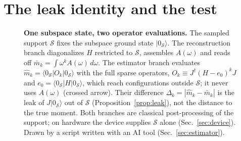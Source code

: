 \documentclass[aps,prb,reprint,onecolumn,12pt,superscriptaddress,longbibliography,floatfix]{revtex4-2}
\begin{document}
\section{The leak identity and the test}
\label{sec:method}

\begin{figure}[t]
\centering
{}
\caption{\textbf{One subspace state, two operator evaluations.} The sampled support $\mathcal S$ fixes the subspace ground state $|0_\mathcal S\rangle$. The reconstruction branch diagonalizes $H$ restricted to $\mathcal S$, assembles $A(\omega)$ and reads off $\bar m_k=\int\omega^kA(\omega)\,d\omega$. The estimator branch evaluates $\widehat m_k=\langle 0_\mathcal S|O_k|0_\mathcal S\rangle$ with the full sparse operators, $O_k\equiv J^\dagger(H-e_0)^kJ$ and $e_0=\langle 0_\mathcal S|H|0_\mathcal S\rangle$, which reach configurations outside $\mathcal S$; it never uses $A(\omega)$ (crossed arrow). Their difference $\Delta_k=|\widehat m_k-\bar m_k|$ is the leak of $J|0_\mathcal S\rangle$ out of $\mathcal S$ (Proposition~\ref{prop:leak}), not the distance to the true moment. Both branches are classical post-processing of the support; on hardware the device supplies $\mathcal S$ alone (Sec.~\ref{sec:device}). Drawn by a script written with an AI tool (Sec.~\ref{sec:estimator}).}
\label{fig:hero}
\end{figure}
\end{document}
